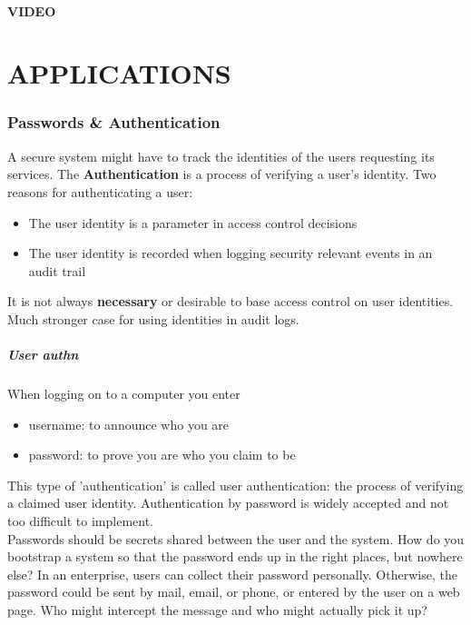 \documentclass[a4paper, 10pt, titlepage]{article}
\begin{document}
\subsection{VIDEO}

\newpage
\thispagestyle{empty}
\part{APPLICATIONS}

\newpage
\section{Passwords \& Authentication}
A secure system might have to track the identities of the users requesting its services. The \textbf{Authentication} is a process of verifying a user’s identity.
Two reasons for authenticating a user:
\begin{itemize}
\item The user identity is a parameter in access control decisions
\item The user identity is recorded when logging security relevant events in an audit trail
\end{itemize}
It is not always \textbf{necessary} or desirable to base access control on user identities. Much stronger case for using identities in audit logs.

\subsubsection*{User authn}
When logging on to a computer you enter
\begin{itemize}
\item username: to announce who you are
\item password: to prove you are who you claim to be
\end{itemize}
This type of 'authentication' is called user authentication: the process of verifying a claimed user identity. Authentication by password is widely accepted and not too difficult to implement. \medskip \\
Passwords should be secrets shared between the user and the system. How do you bootstrap a system so that the password ends up in the
right places, but nowhere else? In an enterprise, users can collect their password personally. Otherwise, the password could be sent by mail, email, or phone, or entered by the user on a web page. Who might intercept the message and who might actually pick it up?
\end{document}
